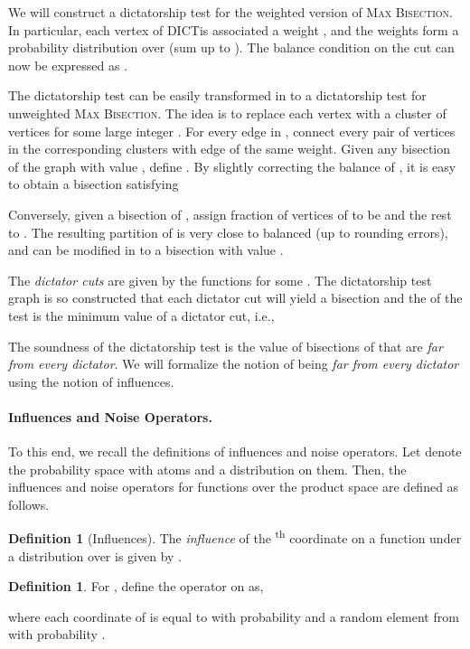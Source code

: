\documentclass[11pt]{article}
\theoremstyle{definition}
\newtheorem{definition}[theorem]{Definition}
\renewcommand{\th}{\textsuperscript{th}\xspace}
\newcommand{\problemmacro}[1]{\texorpdfstring{\textsc{#1}}{#1}\xspace}
\newcommand{\maxbisection}{\problemmacro{Max Bisection}}
\numberwithin{equation}{section}
\let\origparagraph\paragraph
\renewcommand{\paragraph}[1]{\origparagraph{#1.}}
\newcommand{\dict} {\textsf{DICT}}
\begin{document}
	We will construct a dictatorship test for the weighted version
	of \maxbisection.  In particular, each vertex  of \dict is
	associated a weight , and the weights  form a
	probability distribution over  (sum up to ).  The
	balance condition on the cut can now be expressed as
	.

The dictatorship test  can be easily
	transformed in to a dictatorship test  for unweighted
	\maxbisection.  The idea is to replace each vertex  with a cluster  of 
	vertices for some large integer .  For every edge
	 in , connect every pair of vertices
	in the corresponding clusters  with
	edge of the same weight.  Given any bisection  of the graph 
	with value , define .  By slightly correcting the balance of , it is
	easy to obtain a bisection 
	satisfying
	
	Conversely, given a bisection  of
	, assign  fraction of vertices of
	 to be  and the rest to .  The resulting
	partition of  is very close to balanced (up to
	rounding errors), and can be modified in to a bisection with
	value .


	The {\it dictator cuts} are given by the functions
	 for some .
	The dictatorship test graph is so constructed that each
	dictator cut will yield a bisection and the  of the test  is the minimum value of a dictator cut, i.e.,
	
	The soundness of the dictatorship test is the value of
	bisections of  that are {\it far from every dictator}.  We will formalize the notion of being
	{\it far from every dictator} using the notion of influences.

\paragraph{Influences and Noise Operators}

	To this end, we recall the definitions of influences and noise
	operators.  Let  denote the probability space with atoms
 and a distribution  on them.  Then, the influences and
noise operators for functions over the product space  are
defined as follows.
	\begin{definition}[Influences]
	The {\it influence} of the \th coordinate on a function
	 under a distribution 
	over  is given by
	.
	\end{definition}
	
\begin{definition}
  For , define the operator  on
 as,

where each coordinate  of  is  equal
to 
\textrm{ with probability } and a random element from
 with probability .
\end{definition}
\end{document}
